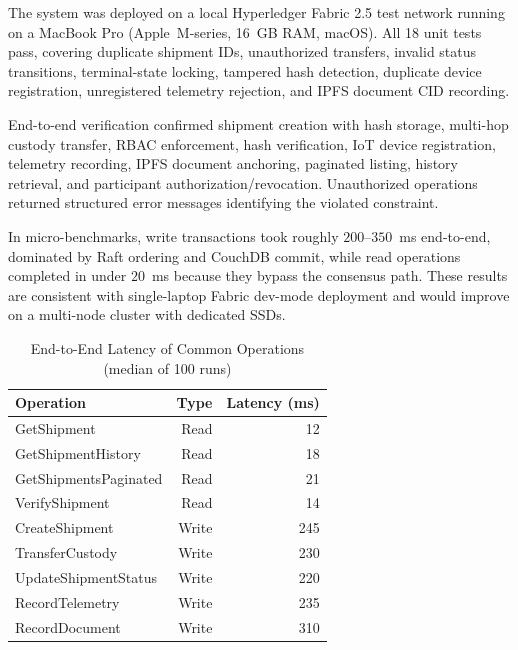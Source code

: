 \documentclass[conference]{IEEEtran}
\begin{document}
The system was deployed on a local Hyperledger Fabric 2.5 test network
running on a MacBook Pro (Apple~M-series, 16~GB RAM, macOS). All 18 unit
tests pass, covering duplicate shipment IDs, unauthorized transfers, invalid
status transitions, terminal-state locking, tampered hash detection,
duplicate device registration, unregistered telemetry rejection, and IPFS
document CID recording.

End-to-end verification confirmed shipment creation with hash storage,
multi-hop custody transfer, RBAC enforcement, hash verification, IoT device
registration, telemetry recording, IPFS document anchoring, paginated listing,
history retrieval, and participant authorization/revocation. Unauthorized
operations returned structured error messages identifying the violated
constraint.

In micro-benchmarks, write transactions took roughly $200$--$350$~ms
end-to-end, dominated by Raft ordering and CouchDB commit, while read
operations completed in under $20$~ms because they bypass the consensus path.
These results are consistent with single-laptop Fabric dev-mode deployment
and would improve on a multi-node cluster with dedicated SSDs.

\begin{table}[!t]
\caption{End-to-End Latency of Common Operations (median of 100 runs)}
\label{tab:latency}
\centering
\footnotesize
\renewcommand{\arraystretch}{1.1}
\begin{tabular}{@{}l r r@{}}
\toprule
\textbf{Operation} & \textbf{Type} & \textbf{Latency (ms)} \\
\midrule
GetShipment            & Read   & 12 \\
GetShipmentHistory     & Read   & 18 \\
GetShipmentsPaginated  & Read   & 21 \\
VerifyShipment         & Read   & 14 \\
CreateShipment         & Write  & 245 \\
TransferCustody        & Write  & 230 \\
UpdateShipmentStatus   & Write  & 220 \\
RecordTelemetry        & Write  & 235 \\
RecordDocument         & Write  & 310 \\
\bottomrule
\end{tabular}
\end{table}
\end{document}
